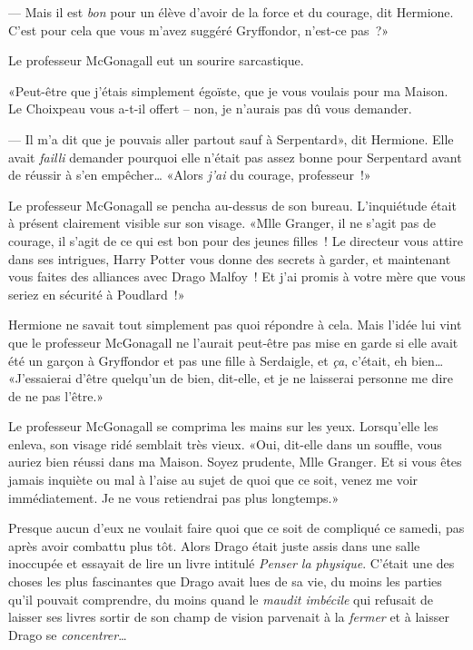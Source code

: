 --- Mais il est \emph{bon} pour un élève d'avoir de la force et du courage, dit Hermione. C'est pour cela que vous m'avez suggéré Gryffondor, n'est-ce pas~?»

Le professeur McGonagall eut un sourire sarcastique.

«Peut-être que j'étais simplement égoïste, que je vous voulais pour ma Maison. Le Choixpeau vous a-t-il offert -- non, je n'aurais pas dû vous demander.

--- Il m'a dit que je pouvais aller partout sauf à Serpentard», dit Hermione. Elle avait \emph{failli} demander pourquoi elle n'était pas assez bonne pour Serpentard avant de réussir à s'en empêcher… «Alors \emph{j'ai} du courage, professeur~!»

Le professeur McGonagall se pencha au-dessus de son bureau. L'inquiétude était à présent clairement visible sur son visage. «Mlle Granger, il ne s'agit pas de courage, il s'agit de ce qui est bon pour des jeunes filles~! Le directeur vous attire dans ses intrigues, Harry Potter vous donne des secrets à garder, et maintenant vous faites des alliances avec Drago Malfoy~! Et j'ai promis à votre mère que vous seriez en sécurité à Poudlard~!»

Hermione ne savait tout simplement pas quoi répondre à cela. Mais l'idée lui vint que le professeur McGonagall ne l'aurait peut-être pas mise en garde si elle avait été un garçon à Gryffondor et pas une fille à Serdaigle, et \emph{ça}, c'était, eh bien… «J'essaierai d'être quelqu'un de bien, dit-elle, et je ne laisserai personne me dire de ne pas l'être.»

Le professeur McGonagall se comprima les mains sur les yeux. Lorsqu'elle les enleva, son visage ridé semblait très vieux. «Oui, dit-elle dans un souffle, vous auriez bien réussi dans ma Maison. Soyez prudente, Mlle Granger. Et si vous êtes jamais inquiète ou mal à l'aise au sujet de quoi que ce soit, venez me voir immédiatement. Je ne vous retiendrai pas plus longtemps.»


Presque aucun d'eux ne voulait faire quoi que ce soit de compliqué ce samedi, pas après avoir combattu plus tôt. Alors Drago était juste assis dans une salle inoccupée et essayait de lire un livre intitulé \emph{Penser la physique}. C'était une des choses les plus fascinantes que Drago avait lues de sa vie, du moins les parties qu'il pouvait comprendre, du moins quand le \emph{maudit imbécile} qui refusait de laisser ses livres sortir de son champ de vision parvenait à la \emph{fermer} et à laisser Drago se \emph{concentrer}…

